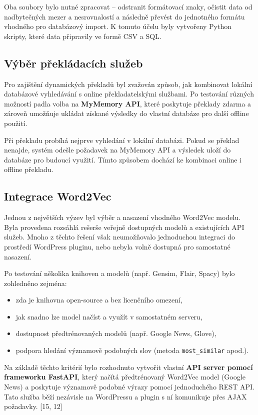\documentclass[czech, ba, kiv, he]{fasthesis}
\begin{document}
Oba soubory bylo nutné zpracovat – odstranit formátovací znaky, očistit data od nadbytečných mezer a nesrovnalostí a následně převést do jednotného formátu vhodného pro databázový import. K tomuto účelu byly vytvořeny Python skripty, které data připravily ve formě CSV a SQL.

\subsection{Výběr překládacích služeb}

Pro zajištění dynamických překladů byl zvažován způsob, jak kombinovat lokální databázové vyhledávání s online překladatelskými službami. Po testování různých možností padla volba na \textbf{MyMemory API}, které poskytuje překlady zdarma a zároveň umožňuje ukládat získané výsledky do vlastní databáze pro další offline použití.

Při překladu probíhá nejprve vyhledání v lokální databázi. Pokud se překlad nenajde, systém odešle požadavek na MyMemory API a výsledek uloží do databáze pro budoucí využití. Tímto způsobem dochází ke kombinaci online i offline překladu.

\subsection{Integrace Word2Vec}

Jednou z největších výzev byl výběr a nasazení vhodného Word2Vec modelu. Byla provedena rozsáhlá rešerše veřejně dostupných modelů a existujících API služeb. Mnoho z těchto řešení však neumožňovalo jednoduchou integraci do prostředí WordPress pluginu, nebo nebyla volně dostupná pro samostatné nasazení.

Po testování několika knihoven a modelů (např. Gensim, Flair, Spacy) bylo zohledněno zejména:

\begin{itemize}
    \item zda je knihovna open-source a bez licenčního omezení,
    \item jak snadno lze model načíst a využít v samostatném serveru,
    \item dostupnost předtrénovaných modelů (např. Google News, Glove),
    \item podpora hledání významově podobných slov (metoda \texttt{most\_similar} apod.).
\end{itemize}

Na základě těchto kritérií bylo rozhodnuto vytvořit vlastní \textbf{API server pomocí frameworku FastAPI}, který načítá předtrénovaný Word2Vec model (Google News) a poskytuje významově podobné výrazy pomocí jednoduchého REST API. Tato služba běží nezávisle na WordPressu a plugin s ní komunikuje přes AJAX požadavky. [15, 12]
\end{document}
